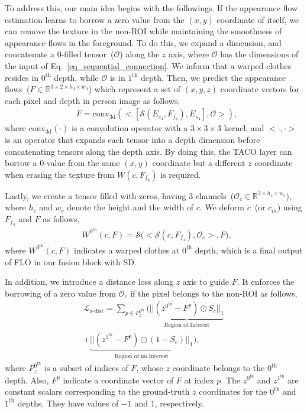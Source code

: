 \documentclass[letterpaper]{article} %
\begin{document}
To address this, our main idea begins with the followings.
If the appearance flow estimation learns to borrow a zero value from the $(x,y)$ coordinate of itself, we can remove the texture in the non-ROI while maintaining the smoothness of appearance flows in the foreground. 
To do this, we expand a dimension, and concatenate a 0-filled tensor~($\mathcal{O}$) along the $z$ axis, where $\mathcal{O}$ has the dimensions of the input of Eq.~\ref{eq_sequential_connection}.
We inform that a warped clothes resides in $0^{\text{th}}$ depth, while $\mathcal{O}$ is in $1^{\text{th}}$ depth.
Then, we predict the appearance flows~($F \in \mathbb{R}^{3 \times 2 \times h_4 \times w_4}$) which represent a set of $(x,y,z)$ coordinate vectors for each pixel and depth in person image as follows,
\begin{eqnarray}
& F = \text{conv}_{\text{3d}}(\big<[\mathcal{S}(E_{{c}_{4}}, F_{f_{4}}), E_{{s}_{4}}], \mathcal{O}\big>),    
\label{eq_af_0_filled}
\end{eqnarray}
where $\text{conv}_{\text{3d}}(\cdot)$ is a convolution operator with a $3\times 3\times 3$ kernel, and $\big< \cdot, \cdot \big>$ is an operator that expands each tensor into a depth dimension before concatenating tensors along the depth axis.
By doing this, the TACO layer can borrow a $0$-value from the same $(x,y)$ coordinate but a different $z$ coordinate when erasing the texture from $W(c,F_{f_4})$ is required. 

Lastly, we create a tensor filled with zeros, having 3 channels~($\mathcal{O}_c \in \mathbb{R}^{3 \times h_c \times w_c}$), where $h_c$ and $w_c$ denote the height and the width of $c$. We deform $c$~(or $c_m$) using $F_{f_4}$ and $F$ as follows,
\begin{eqnarray}
   & W^{0^{\text{th}}}(c,F) = \mathcal{S}\big(\big<\mathcal{S}(c, F_{f_{4}}), \mathcal{O}_c \big>, F \big),
\end{eqnarray}
where $W^{0^{\text{th}}}(c,F)$ indicates a warped clothes at $0^{\text{th}}$ depth, which is a final output of FLO in our fusion block with SD.

In addition, we introduce a distance loss along $z$ axis to guide $F$.
It enforces the borrowing of a zero value from $\mathcal{O}_c$ if the pixel belongs to the non-ROI as follows,
\begin{eqnarray}
    \mathcal{L}_{\text{z-dist}} = \sum\limits_{p \in P_z^{0^{\text{th}}}}(\underbrace{|| (z^{0^{\text{th}}} - F^p) \odot S_c ||_1}_{\text{Region of Interest}} \nonumber \\ + \underbrace{|| (z^{1^{\text{th}}} - F^p ) \odot (1 - S_c) ||_1}_{\text{Region of no Interest}}),
\end{eqnarray}
where $P_z^{0^{\text{th}}}$ is a subset of indices of $F$, whose $z$ coordinate belongs to the $0^{\text{th}}$ depth.
Also, $F^p$ indicate a coordinate vector of $F$ at index $p$.
The $z^{0^{\text{th}}}$ and $z^{1^{\text{th}}}$ are constant scalars corresponding to the ground-truth $z$ coordinates for the $0^{\text{th}}$ and $1^{\text{th}}$ depths. 
They have values of $-1$ and $1$, respectively. 
\end{document}
